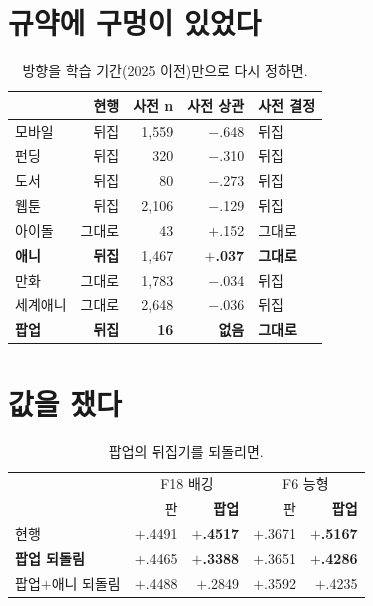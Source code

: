 \documentclass[10pt]{article}
\begin{document}
\section{규약에 구멍이 있었다}

\begin{table}[t]
\centering\tsize
\caption{방향을 학습 기간(2025 이전)만으로 다시 정하면.}
\begin{tabular}{lrrrl}
\toprule
& 현행 & 사전 n & 사전 상관 & 사전 결정 \\
\midrule
모바일 & 뒤집 & 1{,}559 & $-$.648 & 뒤집 \\
펀딩 & 뒤집 & 320 & $-$.310 & 뒤집 \\
도서 & 뒤집 & 80 & $-$.273 & 뒤집 \\
웹툰 & 뒤집 & 2{,}106 & $-$.129 & 뒤집 \\
아이돌 & 그대로 & 43 & $+$.152 & 그대로 \\
\midrule
\textbf{애니} & \textbf{뒤집} & 1{,}467 & \textbf{$+$.037} & \textbf{그대로} \\
만화 & 그대로 & 1{,}783 & $-$.034 & 뒤집 \\
세계애니 & 그대로 & 2{,}648 & $-$.036 & 뒤집 \\
\textbf{팝업} & \textbf{뒤집} & \textbf{16} & \textbf{없음} & \textbf{그대로} \\
\bottomrule
\end{tabular}
\end{table}


\section{값을 쟀다}

\begin{table}[t]
\centering\tsize
\caption{팝업의 뒤집기를 되돌리면.}
\begin{tabular}{lrrrr}
\toprule
& \multicolumn{2}{c}{F18 배깅} & \multicolumn{2}{c}{F6 능형} \\
& 판 & \textbf{팝업} & 판 & \textbf{팝업} \\
\midrule
현행 & $+$.4491 & \textbf{$+$.4517} & $+$.3671 & \textbf{$+$.5167} \\
\textbf{팝업 되돌림} & $+$.4465 & \textbf{$+$.3388} & $+$.3651 & \textbf{$+$.4286} \\
팝업$+$애니 되돌림 & $+$.4488 & $+$.2849 & $+$.3592 & $+$.4235 \\
\bottomrule
\end{tabular}
\end{table}
\end{document}
